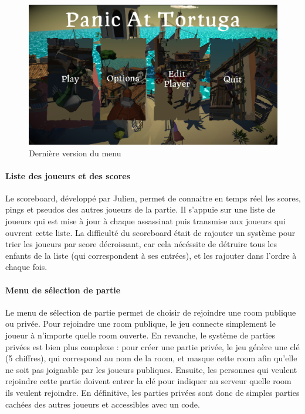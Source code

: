             \begin{figure}[hbt!]
                \centering
                \includegraphics[scale=0.36]{img/menu_principal.png}
                \caption{Dernière version du menu}
            \end{figure}
            \FloatBarrier
        
        \paragraph{Liste des joueurs et des scores}

            Le scoreboard, développé par Julien, permet de connaitre en temps réel les scores, pings et pseudos des autres joueurs de la partie. 
            Il s'appuie sur une liste de joueurs qui est mise à jour à chaque assassinat puis transmise aux joueurs qui ouvrent cette liste. 
            La difficulté du scoreboard était de rajouter un système pour trier les joueurs par score décroissant, car cela nécéssite de 
            détruire tous les enfants de la liste (qui correspondent à ses  entrées), et les rajouter dans l'ordre à chaque fois.

        \paragraph{Menu de sélection de partie}

            Le menu de sélection de partie permet de choisir de rejoindre une room publique ou privée. Pour rejoindre une room publique, le jeu 
            connecte simplement le joueur à n'importe quelle room ouverte. En revanche, le système de parties privées est bien plus complexe :
            pour créer une partie privée, le jeu génère une clé (5 chiffres), qui correspond au nom de la room, et masque cette room afin qu'elle 
            ne soit pas joignable par les joueurs publiques. Ensuite, les personnes qui veulent rejoindre cette partie doivent entrer la clé pour 
            indiquer au serveur quelle room ils veulent rejoindre. En définitive, les parties privées sont donc de simples parties cachées des autres 
            joueurs et accessibles avec un code.

        